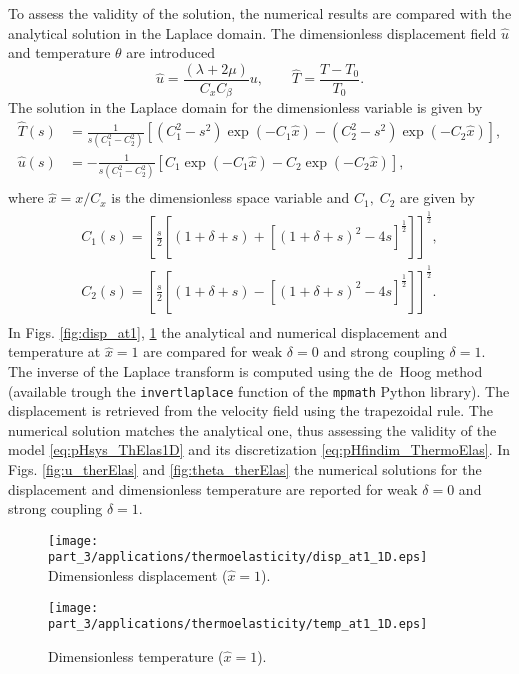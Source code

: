 To assess the validity of the solution, the numerical results are compared with the analytical solution in the Laplace domain. The dimensionless displacement field $\widehat{u}$ and temperature $\theta$ are introduced
$$\widehat{u} = \frac{(\lambda + 2\mu)}{C_x {C}_\beta} u,  \qquad \widehat{T} = \frac{T-T_0}{T_0}.$$
The solution in the Laplace domain for the dimensionless variable is given by \cite{balla1991}
\begin{equation}
\begin{aligned}
\widehat{T}(s) &= \frac{1}{s(C_1^2 - C_2^2)}[(C_1^2- s^2)\exp(-C_1 \widehat{x}) - (C_2^2 - s^2)\exp(-C_2 \widehat{x})], \\
\widehat{u}(s) &= -\frac{1}{s(C_1^2 - C_2^2)}[C_1\exp(-C_1 \widehat{x}) - C_2\exp(-C_2 \widehat{x})], \\
\end{aligned}
\end{equation}
where $\widehat{x} = x/C_x$ is the dimensionless space variable and $C_1, \; C_2$ are given by
\begin{equation}
\begin{aligned}
C_1(s) = \left[\frac{s}{2} [(1+\delta+s)+[(1+\delta+s)^2-4s]^{\frac{1}{2}} ]\right]^{\frac{1}{2}}, \\
C_2(s) = \left[\frac{s}{2} [(1+\delta+s)-[(1+\delta+s)^2-4s]^{\frac{1}{2}} ]\right]^{\frac{1}{2}}. \\
\end{aligned}
\end{equation}
In Figs. \ref{fig:disp_at1}, \ref{fig:temp_at1} the analytical and numerical displacement and temperature at $\widehat{x}=1$ are compared for weak $\delta=0$ and strong coupling $\delta=1$. The inverse of the Laplace transform is computed using the de~Hoog method \cite{dehoog1982} (available trough the \verb|invertlaplace| function of the \verb|mpmath| Python library). The displacement is retrieved from the velocity field using the trapezoidal rule. The numerical solution matches the analytical one, thus assessing the validity of the model \eqref{eq:pHsys_ThElas1D} and its discretization \eqref{eq:pHfindim_ThermoElas}. In Figs. \ref{fig:u_therElas} and \ref{fig:theta_therElas} the numerical solutions for the displacement and dimensionless temperature are reported for weak $\delta=0$ and strong coupling $\delta=1$.


\begin{figure}[p]
	\begin{minipage}[t]{0.48\linewidth}
		\centering
		\texttt{[image: part\_3/applications/thermoelasticity/disp\_at1\_1D.eps]} \\
		\caption{Dimensionless displacement ($\widehat{x} = 1$).}
		\label{fig:disp_at1}
	\end{minipage}
	\hspace{0.5cm}
	\begin{minipage}[t]{0.48\linewidth}
		\centering
		\texttt{[image: part\_3/applications/thermoelasticity/temp\_at1\_1D.eps]}
		\caption{Dimensionless temperature ($\widehat{x} = 1$).}
		\label{fig:temp_at1}
	\end{minipage}
\end{figure}


